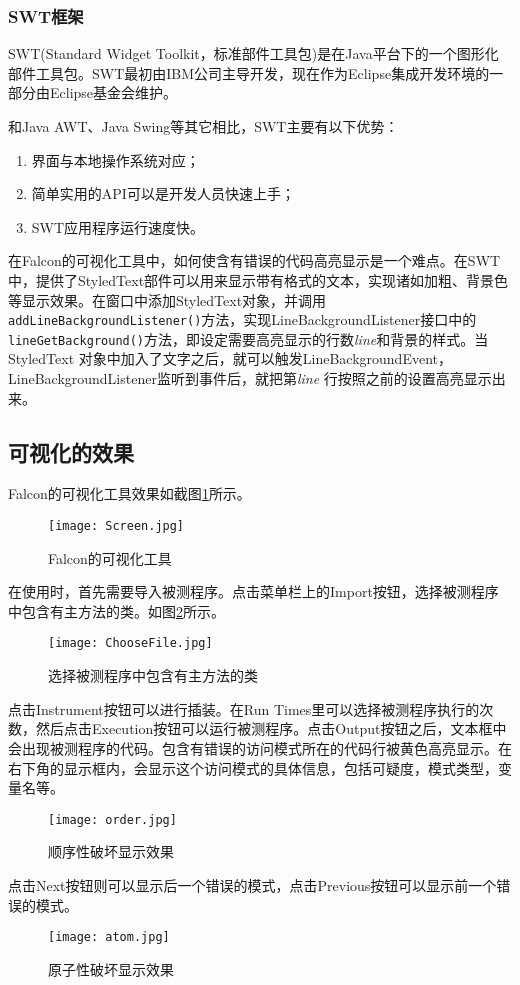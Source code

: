 \subsubsection{SWT框架}
SWT(Standard Widget Toolkit，标准部件工具包)是在Java平台下的一个图形化部件工具包。SWT最初由IBM公司主导开发，现在作为Eclipse集成开发环境的一部分由Eclipse基金会维护\cite{swt_wiki}。\par
和Java AWT、Java Swing等其它相比，SWT主要有以下优势：
\begin{enumerate}
  \item 界面与本地操作系统对应；
  \item 简单实用的API可以是开发人员快速上手；
  \item SWT应用程序运行速度快\cite{SWT}。
\end{enumerate}\par
在Falcon的可视化工具中，如何使含有错误的代码高亮显示是一个难点。在SWT中，提供了StyledText部件可以用来显示带有格式的文本，实现诸如加粗、背景色等显示效果。在窗口中添加StyledText对象，并调用\texttt{addLineBackgroundListener()}方法，实现LineBackgroundListener接口中的\texttt{lineGetBackground()}方法，即设定需要高亮显示的行数\textit{line}和背景的样式。当StyledText 对象中加入了文字之后，就可以触发LineBackgroundEvent，LineBackgroundListener监听到事件后，就把第\textit{line} 行按照之前的设置高亮显示出来。
\subsection{可视化的效果}
Falcon的可视化工具效果如截图\ref{Screen}所示。
\begin{figure}[!ht]
  \centering
  \texttt{[image: Screen.jpg]}\\
  \caption{Falcon的可视化工具}\label{Screen}
\end{figure}
在使用时，首先需要导入被测程序。点击菜单栏上的Import按钮，选择被测程序中包含有主方法的类。如图\ref{ChooseFile}所示。
\begin{figure}[!ht]
  \centering
  \texttt{[image: ChooseFile.jpg]}\\
  \caption{选择被测程序中包含有主方法的类}\label{ChooseFile}
\end{figure}
点击Instrument按钮可以进行插装。在Run Times里可以选择被测程序执行的次数，然后点击Execution按钮可以运行被测程序。点击Output按钮之后，文本框中会出现被测程序的代码。包含有错误的访问模式所在的代码行被黄色高亮显示。在右下角的显示框内，会显示这个访问模式的具体信息，包括可疑度，模式类型，变量名等。
\begin{figure}[!ht]
  \centering
  \texttt{[image: order.jpg]}\\
  \caption{顺序性破坏显示效果}
\end{figure}
点击Next按钮则可以显示后一个错误的模式，点击Previous按钮可以显示前一个错误的模式。
\begin{figure}[!ht]
  \centering
  \texttt{[image: atom.jpg]}\\
  \caption{原子性破坏显示效果}
\end{figure}
